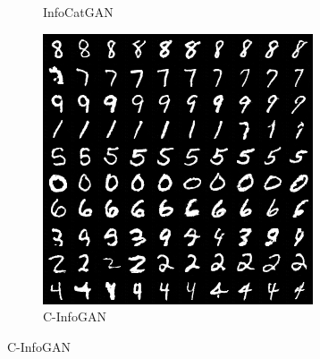 \begin{figure}[htbp]
\begin{subfigure}[b]{\trif\textwidth}
    \caption{InfoCatGAN}
    \label{ffig:m-icg}
  \end{subfigure}
  \begin{subfigure}[b]{\trif\textwidth}
    \includegraphics[width=\textwidth]{Img/ig.png}
    \caption{C-InfoGAN}
    \label{ffig:m-ig}
  \end{subfigure}


\end{figure}
